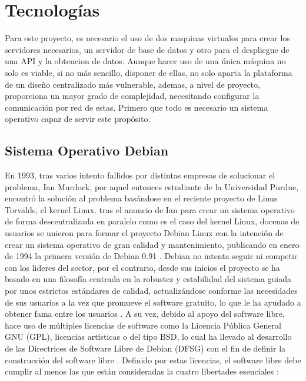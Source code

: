 \chapter[Tecnologías]{Tecnologías}
\label{Chap3}

Para este proyecto, es necesario el uso de dos maquinas virtuales para crear los servidores necesarios, un servidor de base de datos y otro para el despliegue de una API y la obtencion de datos. Aunque hacer uso de una única máquina no solo es viable, si no más sencillo, disponer de ellas, no solo aparta la plataforma de un diseño centralizado más vulnerable, ademas, a nivel de proyecto, proporciona un mayor grado de complejidad, necesitando configurar la comunicación por red de estas. Primero que todo es necesario un sistema operativo capaz de servir este propósito.

\section{Sistema Operativo Debian}
En 1993, tras varios intento fallidos por distintas empresas de solucionar el problema, Ian Murdock, por aquel entonces estudiante de la Universidad Purdue, encontró la solución al problema basándose en el reciente proyecto de Linus Torvalds, el kernel Linux. tras el anuncio de Ian para crear un sistema operativo de forma descentralizada en paralelo como es el caso del kernel Linux, docenas de usuarios se unieron para formar el proyecto Debian Linux con la intención de crear un sistema operativo de gran calidad y mantenimiento, publicando en enero de 1994 la primera versión de Debian 0.91 \cite{krafft2005debian} \cite{DebHis}.\newline
\newline
Debian no intenta seguir ni competir con los lideres del sector, por el contrario, desde sus inicios el proyecto se ha basado en una filosofía centrada en la robustez y estabilidad del sistema guiada por unos estrictos estándares de calidad, actualizándose conforme las necesidades de sus usuarios a la vez que promueve el software gratuito, lo que le ha ayudado a obtener fama entre los usuarios \cite{DebFil} \cite{pollei2013debian}.\newline
\newline
A su vez, debido al apoyo del software libre, hace uso de múltiples licencias de software como la Licencia Pública General GNU (GPL), licencias artísticas o del tipo BSD, lo cual ha llevado al desarrollo de las Directrices de Software Libre de Debian (DFSG) con el fin de definir la construcción del software libre \cite{DebFree}. Definido por estas licencias, el software libre debe cumplir al menos las que están consideradas la cuatro libertades esenciales \cite{GnuFS}:

